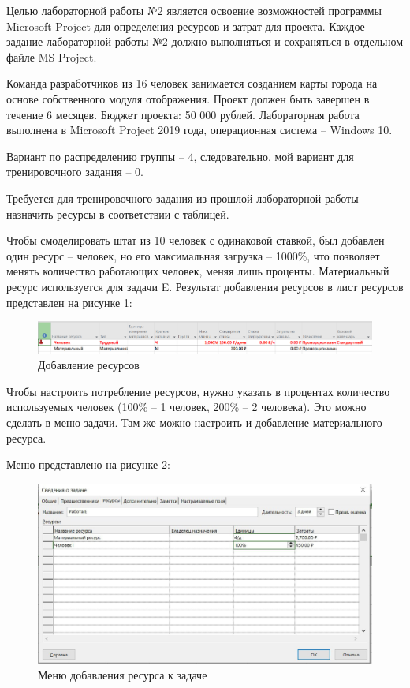 Целью лабораторной работы №2 является освоение возможностей программы Microsoft Project для определения ресурсов и затрат для проекта. 
Каждое задание лабораторной работы №2 должно выполняться и сохраняться в отдельном файле MS Project.

Команда разработчиков из 16 человек занимается созданием карты города на основе собственного модуля отображения. 
Проект должен быть завершен в течение 6 месяцев. Бюджет проекта: 50 000 рублей.
Лабораторная работа выполнена в Microsoft Project 2019 года, операционная система – Windows 10.

Вариант по распределению группы -- 4, следовательно, мой вариант для тренировочного задания -- 0.

Требуется для тренировочного задания из прошлой лабораторной работы назначить ресурсы в соответствии с таблицей.

Чтобы смоделировать штат из 10 человек с одинаковой ставкой, был добавлен один ресурс -- человек, но его максимальная загрузка -- 1000\%, что позволяет менять количество работающих человек, меняя лишь проценты.
Материальный ресурс используется для задачи E.
Результат добавления ресурсов в лист ресурсов представлен на рисунке 1:
\FloatBarrier
\begin{figure}[h]	
	\begin{center}
		\includegraphics[width=\linewidth]{inc/resurs.png}
	\end{center}
	\captionsetup{justification=centering}
	\caption{Добавление ресурсов}
\end{figure}
\FloatBarrier

Чтобы настроить потребление ресурсов, нужно указать в процентах количество используемых человек (100\% -- 1 человек, 200\% -- 2 человека).
Это можно сделать в меню задачи.
Там же можно настроить и добавление материального ресурса.

Меню представлено на рисунке 2:
\FloatBarrier
\begin{figure}[h]	
	\begin{center}
		\includegraphics[width=\linewidth]{inc/0-2.jpg}
	\end{center}
	\captionsetup{justification=centering}
	\caption{Меню добавления ресурса к задаче}
\end{figure}
\FloatBarrier

